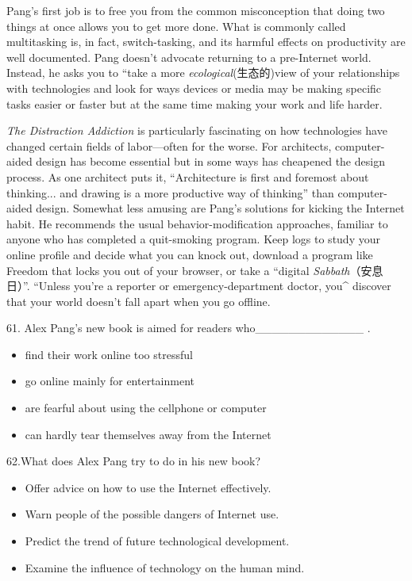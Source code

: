 \documentclass[UTF8,11pt]{ctexart}
\begin{document}
Pang’s first job is to free you from the common misconception that doing two things at once allows you to get more done. What is commonly called multitasking is, in fact, switch-tasking, and its harmful effects on productivity are well documented. Pang doesn’t advocate returning to a pre-Internet world. Instead, he asks you to “take a more\textit{ ecological}(生态的)view of your relationships with technologies and look for ways devices or media may be making specific tasks easier or faster but at the same time making your work and life harder.


\textit{The Distraction Addiction} is particularly fascinating on how technologies have changed certain fields of labor—often for the worse. For architects, computer-aided design has become essential but in some ways has cheapened the design process. As one architect puts it, “Architecture is first and foremost about thinking... and drawing is a more productive way of thinking” than computer-aided design. Somewhat less amusing are Pang’s solutions for kicking the Internet habit. He recommends the usual behavior-modification approaches, familiar to anyone who has completed a quit-smoking program. Keep logs to study your online profile and decide what you can knock out, download a program like Freedom that locks you out of your browser, or take a “digital \textit{Sabbath}（安息日）”. “Unless you’re a reporter or emergency-department doctor, you\textasciicircum{} discover that your world doesn’t fall apart when you go offline.


61. Alex Pang’s new book is aimed for readers who\_\_\_\_\_\_\_\_\_\_\_\_\_ .


\begin{itemize}[leftmargin=2em,itemsep=.2em,topsep=.4em]\item[A.] find their work online too stressful
\item[B.] go online mainly for entertainment
\item[C.] are fearful about using the cellphone or computer
\item[D.] can hardly tear themselves away from the Internet
\end{itemize}

62.What does Alex Pang try to do in his new book?


\begin{itemize}[leftmargin=2em,itemsep=.2em,topsep=.4em]\item[A.] Offer advice on how to use the Internet effectively.
\item[B.] Warn people of the possible dangers of Internet use.
\item[C.] Predict the trend of future technological development.
\item[D.] Examine the influence of technology on the human mind.
\end{itemize}
\end{document}
